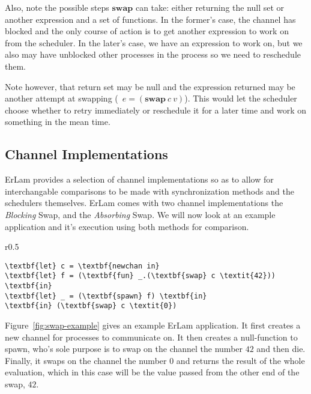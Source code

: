 Also, note the possible steps $\textbf{swap}$ can take: either returning the 
null set or another expression and a set of functions. In the former's case, 
the channel has blocked and the only course of action is to get another 
expression to work on from the scheduler. In the later's case, we have an
expression to work on, but we also may have unblocked other processes in the
process so we need to reschedule them. 

Note however, that return set may be null and the expression returned may be
another attempt at swapping (\ie~$e = (\textbf{swap}\:c\:v)$). This would let 
the scheduler choose whether to retry immediately or reschedule it for a later
time and work on something in the mean time.

\subsection{Channel Implementations}\label{sec:channel implementations}

ErLam provides a selection of channel implementations so as to allow for 
interchangable comparisons to be made with synchronization methods and the 
schedulers themselves. ErLam comes with two channel implementations the 
{\sl Blocking} Swap, and the {\sl Absorbing} Swap. 
We will now look at an example application and it's execution
using both methods for comparison.

\begin{wrapfigure}{r}{0.5\textwidth}
    \centering
\begin{BVerbatim}[commandchars=\\\{\}]
\textbf{let} c = \textbf{newchan in}
\textbf{let} f = (\textbf{fun} _.(\textbf{swap} c \textit{42})) \textbf{in}
\textbf{let} _ = (\textbf{spawn} f) \textbf{in}
\textbf{in} (\textbf{swap} c \textit{0})
\end{BVerbatim}
    \caption{A simple ErLam application which swaps on a channel before returning.}
    \label{fig:swap-example}
\end{wrapfigure}

Figure~\ref{fig:swap-example} gives an example ErLam application. It first 
creates a new channel for processes to communicate on. It then creates a 
null-function to spawn, who's sole purpose is to swap on the channel the number
$42$ and then die. Finally, it swaps on the channel the number $0$ and returns
the result of the whole evaluation, which in this case will be the value passed
from the other end of the swap, $42$. 

